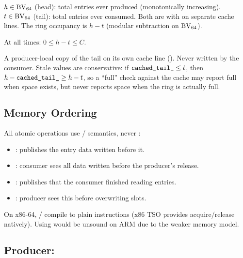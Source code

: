 \begin{definition}
\label{def:headtail}
$h \in \mathrm{BV}_{64}$ (head): total entries ever produced (monotonically increasing).
$t \in \mathrm{BV}_{64}$ (tail): total entries ever consumed.
Both are  with  on separate cache lines.
The ring occupancy is $h - t$ (modular subtraction on $\mathrm{BV}_{64}$).
\end{definition}

\begin{invariant}
\label{inv:ring-bound}
At all times: $0 \le h - t \le C$.
\end{invariant}

\begin{definition}
\label{def:cachedtail}
A producer-local copy of the tail on its own cache line
().  Never written by the consumer.
Stale values are conservative: if $\texttt{cached\_tail\_} \le t$,
then $h - \texttt{cached\_tail\_} \ge h - t$, so a ``full'' check
against the cache may report full when space exists, but never reports
space when the ring is actually full.
\end{definition}

\subsection{Memory Ordering}

All atomic operations use / semantics, never :

\begin{itemize}
  \item {}: publishes the entry data written before it.
  \item {}: consumer sees all data written before the producer's release.
  \item {}: publishes that the consumer finished reading entries.
  \item {}: producer sees this before overwriting slots.
\end{itemize}

On x86-64, / compile to plain 
instructions (x86 TSO provides acquire/release natively).
Using  would be unsound on ARM due to the weaker memory model.

\subsection{Producer: }

